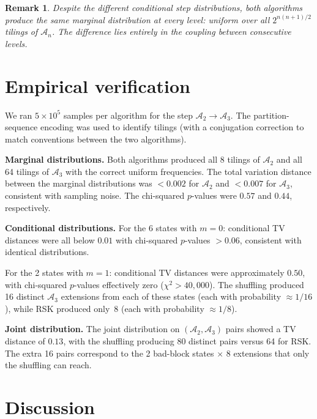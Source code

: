 \documentclass[letterpaper,11pt,oneside]{article}
\newtheorem{remark}[proposition]{Remark}
\newcommand{\AZ}{\mathcal{A}}
\begin{document}
\begin{remark}
  Despite the different conditional step distributions, both algorithms
  produce the same \emph{marginal} distribution at every level: uniform over
  all $2^{n(n+1)/2}$ tilings of $\AZ_n$.  The difference lies entirely in
  the coupling between consecutive levels.
\end{remark}

\section{Empirical verification}

We ran $5 \times 10^5$ samples per algorithm for the step $\AZ_2 \to \AZ_3$.
The partition-sequence encoding was used to identify tilings (with a
conjugation correction to match conventions between the two algorithms).

\smallskip

\noindent\textbf{Marginal distributions.}
Both algorithms produced all 8 tilings of $\AZ_2$ and all 64 tilings of
$\AZ_3$ with the correct uniform frequencies.  The total variation distance
between the marginal distributions was $< 0.002$ for $\AZ_2$ and $< 0.007$
for $\AZ_3$, consistent with sampling noise.  The chi-squared $p$-values
were $0.57$ and $0.44$, respectively.

\smallskip

\noindent\textbf{Conditional distributions.}
For the 6 states with $m = 0$: conditional TV distances were all below $0.01$
with chi-squared $p$-values $> 0.06$, consistent with identical distributions.

For the 2 states with $m = 1$: conditional TV distances were approximately
$\mathbf{0.50}$, with chi-squared $p$-values effectively zero ($\chi^2 >
40{,}000$).  The shuffling produced 16 distinct $\AZ_3$ extensions from each
of these states (each with probability $\approx 1/16$), while RSK produced
only~8 (each with probability $\approx 1/8$).

\smallskip

\noindent\textbf{Joint distribution.}
The joint distribution on $(\AZ_2, \AZ_3)$ pairs showed a TV distance of
$0.13$, with the shuffling producing 80 distinct pairs versus 64 for RSK.
The extra 16 pairs correspond to the 2 bad-block states $\times$ 8 extensions
that only the shuffling can reach.

\section{Discussion}
\end{document}
